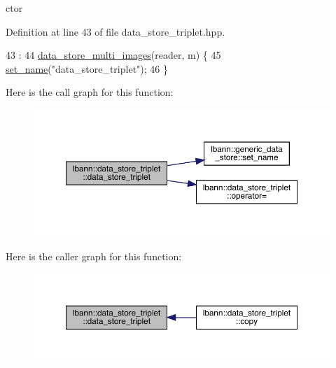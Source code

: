 ctor 



Definition at line 43 of file data\+\_\+store\+\_\+triplet.\+hpp.


\begin{DoxyCode}
43                                                             :
44     \hyperlink{classlbann_1_1data__store__multi__images_a1ad4fbec5c15f98422ebf7027f3a1d8a}{data\_store\_multi\_images}(reader, m) \{
45     \hyperlink{classlbann_1_1generic__data__store_a853741295a07b5687921fc56d0d7d5b2}{set\_name}(\textcolor{stringliteral}{"data\_store\_triplet"});
46   \}
\end{DoxyCode}
Here is the call graph for this function\+:\nopagebreak
\begin{figure}[H]
\begin{center}
\leavevmode
\includegraphics[width=350pt]{classlbann_1_1data__store__triplet_ad6ba997401d292ffb9678a75e02a258f_cgraph}
\end{center}
\end{figure}
Here is the caller graph for this function\+:\nopagebreak
\begin{figure}[H]
\begin{center}
\leavevmode
\includegraphics[width=350pt]{classlbann_1_1data__store__triplet_ad6ba997401d292ffb9678a75e02a258f_icgraph}
\end{center}
\end{figure}
\mbox{\label{classlbann_1_1data__store__triplet_a059777d3131c8f8ecae04a8ac9b17036}} 
